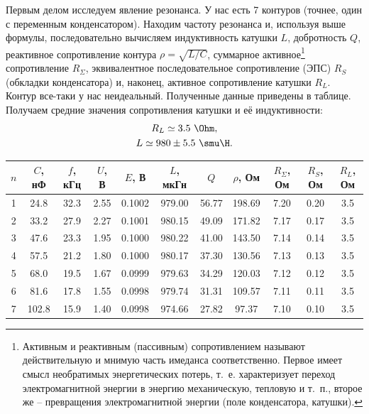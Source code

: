 \documentclass{../lab_class}
\begin{document}
Первым делом исследуем явление резонанса. У нас есть 7 контуров (точнее, один с переменным конденсатором). Находим частоту резонанса и, используя выше формулы, последовательно вычисляем индуктивность катушки $L$, добротность $Q$, реактивное сопротивление контура $\rho = \sqrt{L/C}$, суммарное активное\footnote{Активным и реактивным (пассивным) сопротивлением называют действительную и мнимую часть имеданса соответственно. Первое имеет смысл необратимых энергетических потерь, т.~е. характеризует переход электромагнитной энергии в энергию механическую, тепловую и т.~п., второе же -- превращения электромагнитной энергии (поле конденсатора, катушки).} сопротивление $R_\Sigma$, эквивалентное последовательное сопротивление (ЭПС) $R_S$ (обкладки конденсатора) и, наконец, активное сопротивление катушки $R_L$. Контур все-таки у нас неидеальный. Полученные данные приведены в таблице. Получаем средние значения сопротивления катушки и её индуктивности:
\begin{gather*}
	R_L \simeq 3.5 \ \Ohm, \\
	L \simeq 980 \pm 5.5 \ \smu \H.
\end{gather*}

\pagebreak

\begin{tabular}{|c|c|c|c|c|c|c|c|c|c|c|}
\hline
$n$ &  $C$, нФ &  $f$, кГц &  $U$, В &    $E$, В &  $L$, мкГн &      $Q$ &  $\rho$, Ом &  $R_\Sigma$, Ом &  $R_S$, Ом &  $R_L$, Ом \\
\hline
 1 &   24.8 &    32.3 &  2.55 &  0.1002 &   979.00 &  56.77 &   198.69 &         7.20 &     0.20 &      3.5 \\ \hline
 2 &   33.2 &    27.9 &  2.27 &  0.1001 &   980.15 &  49.09 &   171.82 &         7.17 &     0.17 &      3.5 \\ \hline
 3 &   47.6 &    23.3 &  1.95 &  0.1000 &   980.22 &  41.00 &   143.50 &         7.14 &     0.14 &      3.5 \\ \hline
 4 &   57.5 &    21.2 &  1.80 &  0.1000 &   980.17 &  37.30 &   130.56 &         7.13 &     0.13 &      3.5 \\ \hline
 5 &   68.0 &    19.5 &  1.67 &  0.0999 &   979.63 &  34.29 &   120.03 &         7.12 &     0.12 &      3.5 \\ \hline
 6 &   81.6 &    17.8 &  1.55 &  0.0998 &   979.74 &  31.31 &   109.57 &         7.11 &     0.11 &      3.5 \\ \hline
 7 &  102.8 &    15.9 &  1.40 &  0.0998 &   974.66 &  27.82 &    97.37 &         7.10 &     0.10 &      3.5 \\ \hline
\end{tabular}
\end{document}
